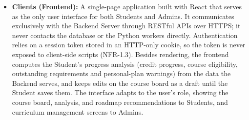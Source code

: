\begin{itemize}
    \item \textbf{Clients (Frontend):} A single-page application built with React that serves as the only user interface for both Students and Admins. It communicates exclusively with the Backend Server through RESTful APIs over HTTPS; it never contacts the database or the Python workers directly. Authentication relies on a session token stored in an HTTP-only cookie, so the token is never exposed to client-side scripts (NFR-1.3). Besides rendering, the frontend computes the Student's progress analysis (credit progress, course eligibility, outstanding requirements and personal-plan warnings) from the data the Backend serves, and keeps edits on the course board as a draft until the Student saves them. The interface adapts to the user's role, showing the course board, analysis, and roadmap recommendations to Students, and curriculum management screens to Admins.


\end{itemize}

